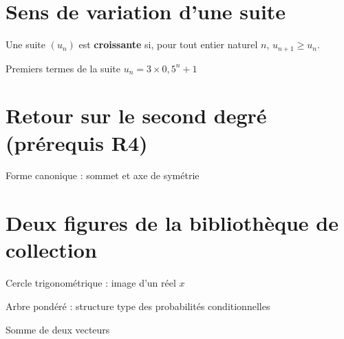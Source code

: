 \documentclass{gabarits/nexus-manuel-v5}
\begin{document}
\nxActiverDecor

\section{Sens de variation d'une suite}

\begin{nxdef}[D1]
Une suite $(u_n)$ est \textbf{croissante} si, pour tout entier naturel $n$,
$u_{n+1} \geqslant u_n$.
\end{nxdef}


\begin{nxfigure}{Premiers termes de la suite $u_n = 3\times 0{,}5^n + 1$}
\end{nxfigure}

\section{Retour sur le second degré (prérequis R4)}

\begin{nxfigure}{Forme canonique : sommet et axe de symétrie}
\end{nxfigure}


\section{Deux figures de la bibliothèque de collection}

\begin{nxfigure}{Cercle trigonométrique : image d'un réel $x$}
  \figCercleTrigo[50]
\end{nxfigure}

\begin{nxfigure}{Arbre pondéré : structure type des probabilités conditionnelles}
\end{nxfigure}

\begin{nxfigure}{Somme de deux vecteurs}
\end{nxfigure}
\end{document}
